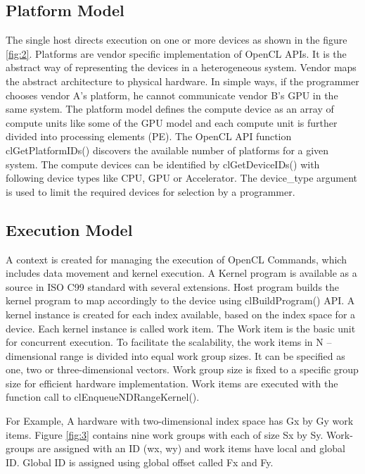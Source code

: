 \subsection{Platform Model}
The single host directs execution on one or more devices as shown in the figure \ref{fig:2}. Platforms are vendor specific implementation of OpenCL APIs. It is the abstract way of representing the devices in a heterogeneous system. Vendor maps the abstract architecture to physical hardware. In simple ways, if the programmer chooses vendor A's platform, he cannot communicate vendor B's GPU in the same system.  The platform model defines the compute device as an array of compute units like some of the GPU model and each compute unit is further divided into processing elements (PE). The OpenCL API function clGetPlatformIDs() discovers the available number of platforms for a given system. The compute devices can be identified by clGetDeviceIDs() with following device types like CPU, GPU or Accelerator. The device\_type argument is used to limit the required devices for selection by a programmer.


\subsection{Execution Model}
A context is created for managing the execution of OpenCL Commands, which includes data movement and kernel execution. A Kernel program is available as a source in ISO C99 standard with several extensions. Host program builds the kernel program to map accordingly to the device using clBuildProgram() API. A kernel instance is created for each index available, based on the index space for a device. Each kernel instance is called work item. The Work item is the basic unit for concurrent execution. To facilitate the scalability, the work items in N -- dimensional range is divided into equal work group sizes. It can be specified as one, two or three-dimensional vectors. Work group size is fixed to a specific group size for efficient hardware implementation. Work items are executed with the function call to clEnqueueNDRangeKernel().


For Example, A hardware with two-dimensional index space has Gx by Gy work items. Figure \ref{fig:3} \cite{12} contains nine work groups with each of size Sx by Sy. Work-groups are assigned with an ID (wx, wy) and work items have local and global ID. Global ID is assigned using global offset called Fx and Fy. 

